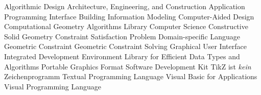 \begin{acronym}[CGAL]
     {Algorithmic Design}
    {Architecture, Engineering, and Construction}
    {Application Programming Interface}
    {Building Information Modeling}
    {Computer-Aided Design}
   {Computational Geometry Algorithms Library}
     {Computer Science}
    {Constructive Solid Geometry}
    {Constraint Satisfaction Problem}
    {Domain-specific Language}
     {Geometric Constraint}
    {Geometric Constraint Solving}
    {Graphical User Interface}
    {Integrated Development Environment}
   {Library for Efficient Data Types and Algorithms}
    {Portable Graphics Format}
    {Software Development Kit}
   {TikZ ist \textit{kein} Zeichenprogramm}
    {Textual Programming Language}
    {Visual Basic for Applications}
    {Visual Programming Language}
\end{acronym}
